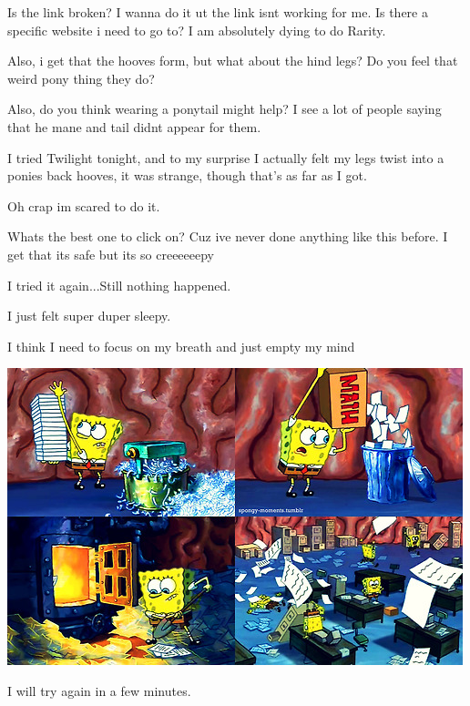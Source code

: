\documentclass[ebook,12pt,oneside,openany]{memoir}
\begin{document}
\begin{tcolorbox}[title=SkyeRibbonPwny]
\par{Is the link broken? I wanna do it ut the link isnt working for me. Is there a specific website i need to go to? I am absolutely dying to do Rarity.}
\par{Also, i get that the hooves form, but what about the hind legs? Do you feel that weird pony thing they do? }
\par{Also, do you think wearing a ponytail might help? I see a lot of people saying that he mane and tail didnt appear for them.}
\end{tcolorbox}
\begin{tcolorbox}[title=Dusty Soul]
\par{I tried Twilight tonight, and to my surprise I actually felt my legs twist into a ponies back hooves, it was strange, though that's as far as I got.  }
\end{tcolorbox}
\begin{tcolorbox}[title=SkyeRibbonPwny]
\par{Oh crap im scared to do it.}
\par{Whats the best one to click on? Cuz ive never done anything like this before. I get that its safe but its so creeeeeepy}
\end{tcolorbox}
\begin{tcolorbox}[title=Miss Light Diamond]
\par{I tried it again...Still nothing happened.}
\par{I just felt super duper sleepy.}
\par{I think I need to focus on my breath and just empty my mind}
\par{\includegraphics[width=\textwidth]{images/img-1118175-1-tumblr_m9ed6t1xzM1qj8u1do1_500.jpg}}
\par{I will try again in a few minutes.}
\end{tcolorbox}
\end{document}
